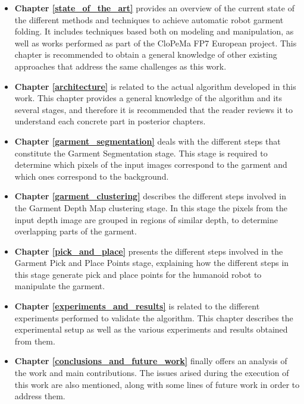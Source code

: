\begin{itemize}
\item \textbf{Chapter \ref{state_of_the_art}} provides an overview of the current state of the different methods and techniques to achieve automatic robot garment folding. It includes techniques based both on modeling and manipulation, as well as works performed as part of the CloPeMa FP7 European project. This chapter is recommended to obtain a general knowledge of other existing approaches that address the same challenges as this work.
\item \textbf{Chapter \ref{architecture}} is related to the actual algorithm developed in this work. This chapter provides a general knowledge of the algorithm and its several stages, and therefore it is recommended that the reader reviews it to understand each concrete part in posterior chapters.
\item \textbf{Chapter \ref{garment_segmentation}} deals with the different steps that constitute the Garment Segmentation stage. This stage is required to determine which pixels of the input images correspond to the garment and which ones correspond to the background.
\item \textbf{Chapter \ref{garment_clustering}} describes the different steps involved in the Garment Depth Map clustering stage. In this stage the pixels from the input depth image are grouped in regions of similar depth, to determine overlapping parts of the garment.
\item \textbf{Chapter \ref{pick_and_place}} presents the different steps involved in the Garment Pick and Place Points stage, explaining how the different steps in this stage generate pick and place points for the humanoid robot to manipulate the garment.
\item \textbf{Chapter \ref{experiments_and_results}} is related to the different experiments performed to validate the algorithm. This chapter describes the experimental setup as well as the various experiments and results obtained from them.
\item \textbf{Chapter \ref{conclusions_and_future_work}} finally offers an analysis of the work and main contributions. The issues arised during the execution of this work are also mentioned, along with some lines of future work in order to address them.
\end{itemize}
